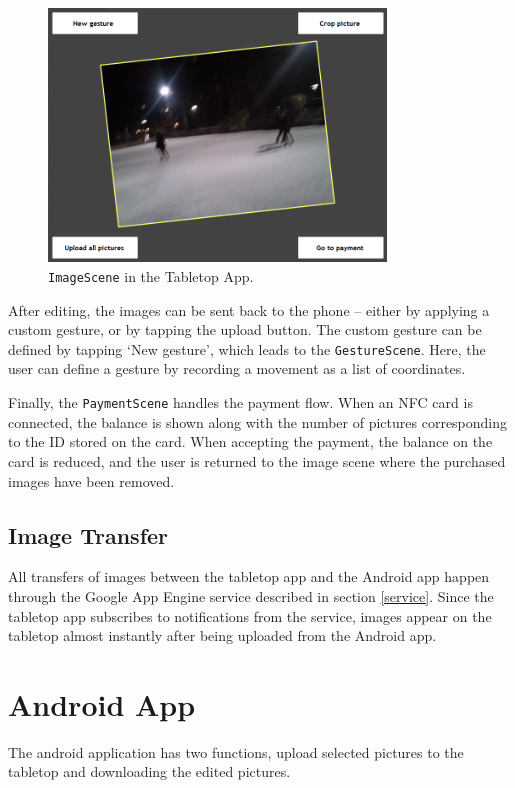 \documentclass{article}
\begin{document}
\begin{figure}[t]
\begin{center}
\includegraphics[width=0.8\textwidth]{image-scene.png}
\end{center}
\caption{\lstinline{ImageScene} in the Tabletop App.}
\label{fig:image-scene}
\end{figure}
 
After editing, the images can be sent back to the phone -- either by applying a custom gesture, or by tapping the upload button. The custom gesture can be defined by tapping `New gesture', which leads to the \lstinline{GestureScene}. Here, the user can define a gesture by recording a movement as a list of coordinates.
 
Finally, the \lstinline{PaymentScene} handles the payment flow. When an NFC card is connected, the balance is shown along with the number of pictures corresponding to the ID stored on the card. When accepting the payment, the balance on the card is reduced, and the user is returned to the image scene where the purchased images have been removed.
 
\subsection{Image Transfer}
All transfers of images between the tabletop app and the Android app happen through the Google App Engine service described in section \ref{service}. Since the tabletop app subscribes to notifications from the service, images appear on the tabletop almost instantly after being uploaded from the Android app.
 
\section{Android App}
The android application has two functions, upload selected pictures to the tabletop and downloading the edited pictures.
 
\end{document}
